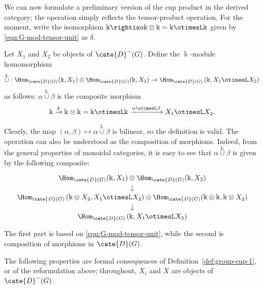 We can now formulate a preliminary version of the cup product in the derived
category; the operation simply reflects the tensor-product operation. For the
moment, write the isomorphism
$\Bbbk\rightiso\Bbbk\otimes\Bbbk=\Bbbk\otimesL\Bbbk$ given by
\eqref{eqn:G-mod-tensor-unit} as $\delta$.

\begin{definition}\label{def:group-cup-1}
	Let $X_1$ and $X_2$ be objects of $\cate{D}^-(G)$. Define the
	$\Bbbk$-module homomorphism
	\[ \overset{\mathrm{L}}{\cup}: \Hom_{\cate{D}(G)}(\Bbbk, X_1) \otimes \Hom_{\cate{D}(G)}(\Bbbk, X_2) \to \Hom_{\cate{D}(G)}\left(\Bbbk, X_1 \otimesL X_2\right) \]
	as follows: $\alpha\overset{\mathrm{L}}{\cup}\beta$ is the composite
	morphism
	\[ \Bbbk \xrightarrow{\delta} \Bbbk \otimes \Bbbk = \Bbbk \otimesL \Bbbk \xrightarrow{\alpha \otimesL \beta} X_1 \otimesL X_2. \]
\end{definition}

Clearly, the map
$(\alpha,\beta)\mapsto\alpha\overset{\mathrm{L}}{\cup}\beta$ is bilinear,
so the definition is valid. The operation can also be understood as the
composition of morphisms. Indeed, from the general properties of monoidal
categories, it is easy to see that
$\alpha\overset{\mathrm{L}}{\cup}\beta$ is given by the following composite:
\[\begin{tikzcd}[row sep=small]
	\Hom_{\cate{D}(G)}(\Bbbk, X_1) \otimes \Hom_{\cate{D}(G)}(\Bbbk, X_2) \arrow[d] \\
	\Hom_{\cate{D}(G)}\left( \Bbbk \otimes X_2, X_1 \otimesL X_2\right) \otimes \Hom_{\cate{D}(G)}(\Bbbk \otimes \Bbbk, \Bbbk \otimes X_2) \arrow[d] \\
	\Hom_{\cate{D}(G)}\left(\Bbbk, X_1 \otimesL X_2 \right)
\end{tikzcd}\]
The first part is based on \eqref{eqn:G-mod-tensor-unit}, while the second is
composition of morphisms in $\cate{D}(G)$.

The following properties are formal consequences of
Definition~\ref{def:group-cup-1}, or of the reformulation above; throughout,
$X_i$ and $X$ are objects of $\cate{D}^-(G)$.

